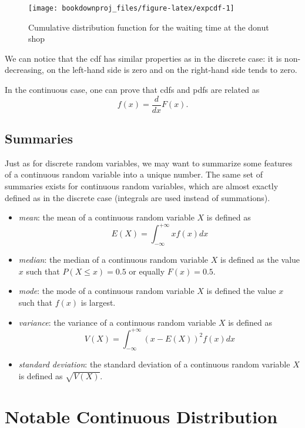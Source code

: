 \documentclass[
]{book}
\begin{document}
\begin{figure}

{\centering \texttt{[image: bookdownproj\_files/figure-latex/expcdf-1]} 

}

\caption{Cumulative distribution function for the waiting time at the donut shop}\label{fig:expcdf}
\end{figure}

We can notice that the cdf has similar properties as in the discrete case: it is non-decreasing, on the left-hand side is zero and on the right-hand side tends to zero.

In the continuous case, one can prove that cdfs and pdfs are related as
\[
f(x)=\frac{d}{dx}F(x).
\]

\hypertarget{summaries-1}{%
\subsection{Summaries}\label{summaries-1}}

Just as for discrete random variables, we may want to summarize some features of a continuous random variable into a unique number. The same set of summaries exists for continuous random variables, which are almost exactly defined as in the discrete case (integrals are used instead of summations).

\begin{itemize}
\item
  \emph{mean}: the mean of a continuous random variable \(X\) is defined as
  \[
   E(X) = \int_{-\infty}^{+\infty}xf(x)dx
   \]
\item
  \emph{median}: the median of a continuous random variable \(X\) is defined as the value \(x\) such that \(P(X\leq x) = 0.5\) or equally \(F(x)=0.5\).
\item
  \emph{mode}: the mode of a continuous random variable \(X\) is defined the value \(x\) such that \(f(x)\) is largest.
\item
  \emph{variance}: the variance of a continuous random variable \(X\) is defined as
  \[
   V(X)=\int_{-\infty}^{+\infty}(x-E(X))^2f(x)dx
   \]
\item
  \emph{standard deviation}: the standard deviation of a continuous random variable \(X\) is defined as \(\sqrt{V(X)}\).
\end{itemize}

\hypertarget{notable-continuous-distribution}{%
\section{Notable Continuous Distribution}\label{notable-continuous-distribution}}
\end{document}
